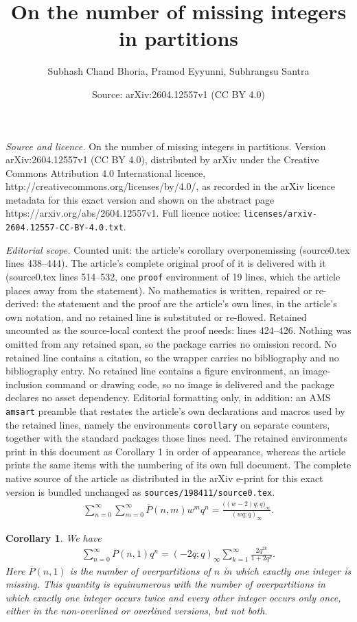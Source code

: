 \documentclass[10pt,a4paper]{amsart}
\title{On the number of missing integers in partitions}
\author{Subhash Chand Bhoria, Pramod Eyyunni, Subhrangsu Santra}
\date{Source: arXiv:2604.12557v1 (CC BY 4.0)}
\newtheorem{corollary}{Corollary}
\begin{document}
\maketitle

\noindent\emph{Source and licence.} On the number of missing integers in partitions. Version arXiv:2604.12557v1 (CC BY 4.0), distributed by arXiv under the Creative Commons Attribution 4.0 International licence, http://creativecommons.org/licenses/by/4.0/, as recorded in the arXiv licence metadata for this exact version and shown on the abstract page https://arxiv.org/abs/2604.12557v1. Full licence notice: \texttt{licenses/arxiv-2604.12557-CC-BY-4.0.txt}.\par\smallskip

\noindent\textit{Editorial scope.} Counted unit: the article's corollary overponemissing (source0.tex lines 438--444). The article's complete original proof of it is delivered with it (source0.tex lines 514--532, one \texttt{proof} environment of 19 lines, which the article places away from the statement). No mathematics is written, repaired or re-derived: the statement and the proof are the article's own lines, in the article's own notation, and no retained line is substituted or re-flowed.  Retained uncounted as the source-local context the proof needs: lines 424--426.  Nothing was omitted from any retained span, so the package carries no omission record.  No retained line contains a citation, so the wrapper carries no bibliography and no bibliography entry.  No retained line contains a figure environment, an image-inclusion command or drawing code, so no image is delivered and the package declares no asset dependency.  Editorial formatting only, in addition: an AMS \texttt{amsart} preamble that restates the article's own declarations and macros used by the retained lines, namely the environments \texttt{corollary} on separate counters, together with the standard packages those lines need.  The retained environments print in this document as Corollary 1 in order of appearance, whereas the article prints the same items with the numbering of its own full document.  The complete native source of the article as distributed in the arXiv e-print for this exact version is bundled unchanged as \texttt{sources/198411/source0.tex}.
\begin{align}
\sum_{n=0}^{\infty}\sum_{m=0}^{\infty} \overline{P}(n,m)w^mq^n=\frac{\big((w-2)q;q\big)_{\infty}}{(wq;q)_{\infty}}.\label{W_GFN_OP}
\end{align}

\begin{corollary}\label{overponemissing}
We have
\begin{align*}
\sum_{n=0}^{\infty}\overline{P}(n,1)q^n=(-2q;q)_{\infty}\sum_{k=1}^{\infty}\frac{2q^{2k}}{1+2q^k}.
\end{align*}
Here $\overline{P}(n,1)$ is the number of overpartitions of $n$ in which exactly one integer is missing. This quantity is equinumerous with the number of overpartitions in which exactly one integer occurs twice and every other integer occurs only once, either in the non-overlined or overlined versions, but not both.
\end{corollary}
\end{document}
